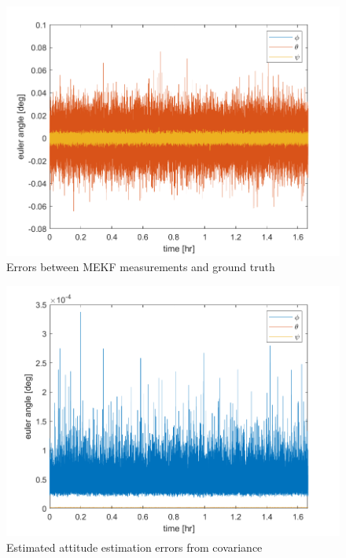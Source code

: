 \begin{figure}[H]
\centering
\includegraphics[scale=0.6]{Images/ps8_problem7_error.png}
\caption{Errors between MEKF measurements and ground truth}
\label{fig:ps8_problem7_error}
\end{figure}

\begin{figure}[H]
\centering
\includegraphics[scale=0.6]{Images/ps8_problem7_cov.png}
\caption{Estimated attitude estimation errors from covariance}
\label{fig:ps8_problem7_cov}
\end{figure}

